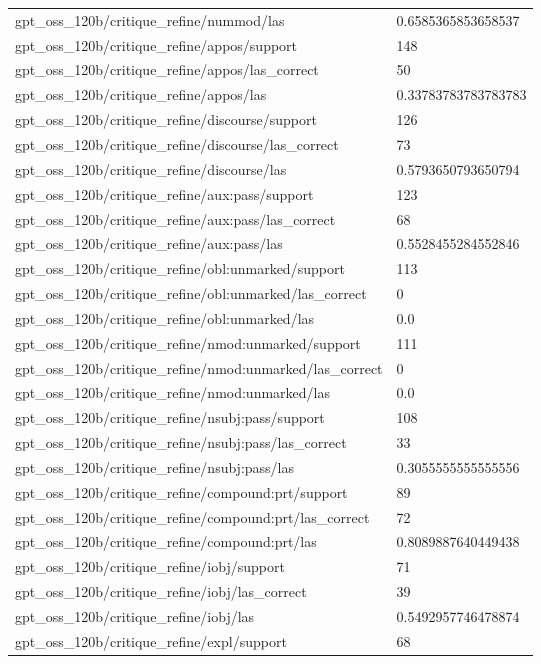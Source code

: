 \begin{tabular}{ll}
gpt\_oss\_120b/critique\_refine/nummod/las & 0.6585365853658537 \\
gpt\_oss\_120b/critique\_refine/appos/support & 148 \\
gpt\_oss\_120b/critique\_refine/appos/las\_correct & 50 \\
gpt\_oss\_120b/critique\_refine/appos/las & 0.33783783783783783 \\
gpt\_oss\_120b/critique\_refine/discourse/support & 126 \\
gpt\_oss\_120b/critique\_refine/discourse/las\_correct & 73 \\
gpt\_oss\_120b/critique\_refine/discourse/las & 0.5793650793650794 \\
gpt\_oss\_120b/critique\_refine/aux:pass/support & 123 \\
gpt\_oss\_120b/critique\_refine/aux:pass/las\_correct & 68 \\
gpt\_oss\_120b/critique\_refine/aux:pass/las & 0.5528455284552846 \\
gpt\_oss\_120b/critique\_refine/obl:unmarked/support & 113 \\
gpt\_oss\_120b/critique\_refine/obl:unmarked/las\_correct & 0 \\
gpt\_oss\_120b/critique\_refine/obl:unmarked/las & 0.0 \\
gpt\_oss\_120b/critique\_refine/nmod:unmarked/support & 111 \\
gpt\_oss\_120b/critique\_refine/nmod:unmarked/las\_correct & 0 \\
gpt\_oss\_120b/critique\_refine/nmod:unmarked/las & 0.0 \\
gpt\_oss\_120b/critique\_refine/nsubj:pass/support & 108 \\
gpt\_oss\_120b/critique\_refine/nsubj:pass/las\_correct & 33 \\
gpt\_oss\_120b/critique\_refine/nsubj:pass/las & 0.3055555555555556 \\
gpt\_oss\_120b/critique\_refine/compound:prt/support & 89 \\
gpt\_oss\_120b/critique\_refine/compound:prt/las\_correct & 72 \\
gpt\_oss\_120b/critique\_refine/compound:prt/las & 0.8089887640449438 \\
gpt\_oss\_120b/critique\_refine/iobj/support & 71 \\
gpt\_oss\_120b/critique\_refine/iobj/las\_correct & 39 \\
gpt\_oss\_120b/critique\_refine/iobj/las & 0.5492957746478874 \\
gpt\_oss\_120b/critique\_refine/expl/support & 68 \\

\end{tabular}
